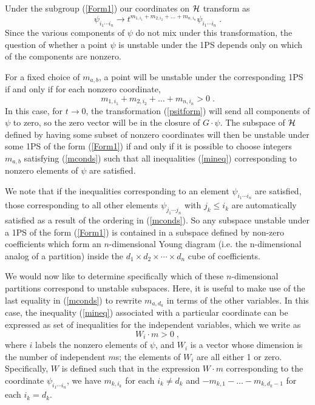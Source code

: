 \documentclass[12pt]{article}
\theoremstyle{definition}
\newcommand{\be}{\begin{equation}}
\newcommand{\ee}{\end{equation}}
\begin{document}
Under the subgroup (\ref{Form1}) our coordinates on ${\cal H}$ transform as
\be
\label{psitform}
\psi_{i_1 \cdots i_n} \to t^{m_{1,i_1} + m_{2,i_2} + \dots + m_{n,i_n}} \psi_{i_1 \cdots i_n} \; .
\ee
Since the various components of $\psi$ do not mix under this transformation, the question of whether a point $\psi$ is unstable under the 1PS depends only on which of the components are nonzero.

For a fixed choice of $m_{a,b}$, a point will be unstable under the corresponding 1PS if and only if for each nonzero coordinate,
\be
\label{mineq}
m_{1,i_1} + m_{2,i_2} + \dots + m_{n,i_n} > 0 \; .
\ee
In this case, for $t \to 0$, the transformation (\ref{psitform}) will send all components of $\psi$ to zero, so the zero vector will be in the closure of $G \cdot \psi$. The subspace of ${\cal H}$ defined by having some subset of nonzero coordinates will then be unstable under some 1PS of the form (\ref{Form1}) if and only if it is possible to choose integers $m_{a,b}$ satisfying (\ref{mconds}) such that all inequalities (\ref{mineq}) corresponding to nonzero elements of $\psi$ are satisfied.

We note that if the inequalities corresponding to an element $\psi_{i_1 \cdots i_n}$ are satisfied, those corresponding to all other elements $\psi_{j_1 \cdots j_n}$ with $j_k \le i_k$ are automatically satisfied as a result of the ordering in (\ref{mconds}). So any subspace unstable under a 1PS of the form (\ref{Form1}) is contained in a subspace defined by non-zero coefficients which form an $n$-dimensional Young diagram (i.e. the n-dimensional analog of a partition) inside the $d_1 \times d_2 \times \cdots \times d_n$ cube of coefficients.

We would now like to determine specifically which of these $n$-dimensional partitions correspond to unstable subspaces. Here, it is useful to make use of the last equality in (\ref{mconds}) to rewrite $m_{a,d_a}$ in terms of the other variables. In this case, the inequality (\ref{mineq}) associated with a particular coordinate can be expressed as set of inequalities for the independent variables, which we write as
\be
\label{dotproduct}
W_i \cdot m > 0 \; ,
\ee
where $i$ labels the nonzero elements of $\psi$, and $W_i$ is a vector whose dimension is the number of independent $m$s; the elements of $W_i$ are all either 1 or zero. Specifically, $W$ is defined such that in the expression $W \cdot m$ corresponding to the coordinate $\psi_{i_1 \cdots i_n}$, we have $m_{k,i_k}$ for each $i_k \ne d_k$ and $-m_{k,1} - \dots - m_{k,d_k - 1}$ for each $i_k = d_k$.
\end{document}
